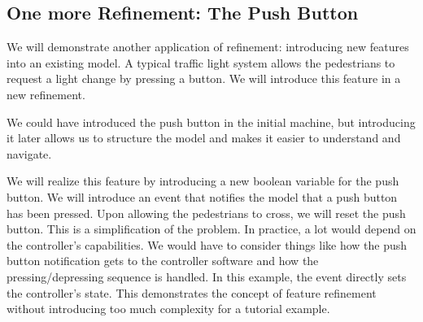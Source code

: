 {\begin{description}
\begin{description}
\begin{description}
			\end{description}
		\Witnesses
			\begin{description}
			\end{description}
		\ThenAct
			\begin{description}
			\nItemX{ act1 }{ cars\_colours :=  new\_value\_colours }
			\end{description}
		\EndAct
		\end{description}
\END
\end{description}
}

\subsection{One more Refinement: The Push Button}
\label{tut_one_more_refinement}

We will demonstrate another application of refinement: introducing new features into an existing model.  A typical traffic light system allows the pedestrians to request a light change by pressing a button.  We will introduce this feature in a new refinement.

We could have introduced the push button in the initial machine, but introducing it later allows us to structure the model and makes it easier to understand and navigate.

We will realize this feature by introducing a new boolean variable for the push button.  We will introduce an event that notifies the model that a push button has been pressed.  Upon allowing the pedestrians to cross, we will reset the push button.  This is a simplification of the problem.  In practice, a lot would depend on the controller's capabilities.  We would have to consider things like how the push button notification gets to the controller software and how the pressing/depressing sequence is handled. In this example, the event directly sets the controller's state.  This demonstrates the concept of feature refinement without introducing too much complexity for a tutorial example.

